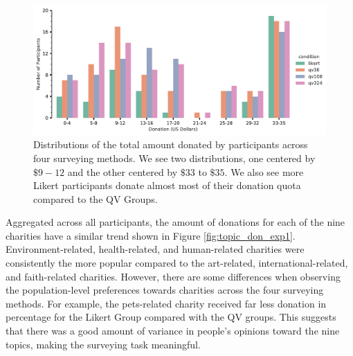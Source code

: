 \begin{figure}[htpb]
    \centering
    \includegraphics[width=\textwidth, keepaspectratio=true]{content/image/total_contributions_across_conditions.pdf}
    \caption{
       Distributions of the total amount donated by participants across four surveying methods.
       We see two distributions, one centered by $\$9-12$ and the other centered by $\$33$ to $\$35$.
       We also see more Likert participants donate almost most of their donation quota compared to the QV Groups.
    }
    \label{fig:total_don_exp1}
\end{figure}

Aggregated across all participants,
the amount of donations for each 
of the nine charities have a similar trend
shown in Figure \ref{fig:topic_don_exp1}. 
Environment-related, health-related, and human-related charities 
were consistently the more popular 
compared to the art-related, international-related, and faith-related charities.
However, there are some differences 
when observing the population-level preferences 
towards charities across the four surveying methods. 
For example, the pets-related charity 
received far less donation in percentage 
for the Likert Group compared with the QV groups. 
This suggests that there was a good amount of variance 
in people's opinions toward the nine topics, 
making the surveying task meaningful.

